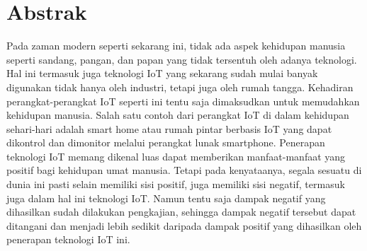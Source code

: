 \documentclass[12pt, letterpaper]{article}
\begin{document}
\section*{Abstrak}
Pada zaman modern seperti sekarang ini, tidak ada aspek kehidupan manusia seperti sandang, pangan, dan papan yang tidak tersentuh oleh adanya teknologi. Hal ini termasuk juga teknologi IoT yang sekarang sudah mulai banyak digunakan tidak hanya oleh industri, tetapi juga oleh rumah tangga. Kehadiran perangkat-perangkat IoT seperti ini tentu saja dimaksudkan untuk memudahkan kehidupan manusia. Salah satu contoh dari perangkat IoT di dalam kehidupan sehari-hari adalah smart home atau rumah pintar berbasis IoT yang dapat dikontrol dan dimonitor melalui perangkat lunak smartphone.
\newline
\indent
Penerapan teknologi IoT memang dikenal luas dapat memberikan manfaat-manfaat yang positif bagi kehidupan umat manusia. Tetapi pada kenyataanya, segala sesuatu di dunia ini pasti selain memiliki sisi positif, juga memiliki sisi negatif, termasuk juga dalam hal ini teknologi IoT. Namun tentu saja dampak negatif yang dihasilkan sudah dilakukan pengkajian, sehingga dampak negatif tersebut dapat ditangani dan menjadi lebih sedikit daripada dampak positif yang dihasilkan oleh penerapan teknologi IoT ini.

\newpage
\end{document}
